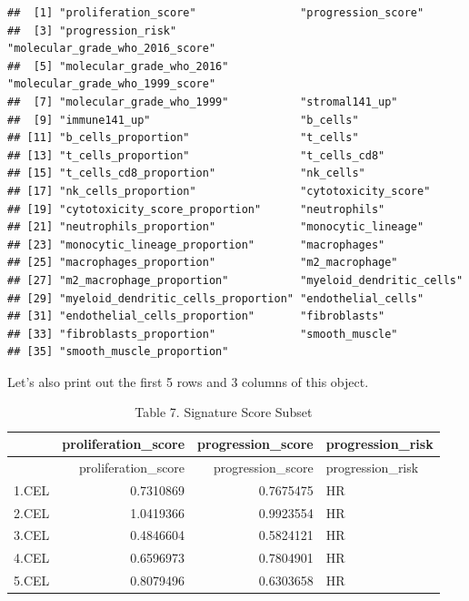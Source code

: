 \documentclass[
]{article}
\newenvironment{Shaded}{\begin{snugshade}}{\end{snugshade}}
\newcommand{\AttributeTok}[1]{\textcolor[rgb]{0.13,0.29,0.53}{#1}}
\newcommand{\DecValTok}[1]{\textcolor[rgb]{0.00,0.00,0.81}{#1}}
\newcommand{\FunctionTok}[1]{\textcolor[rgb]{0.13,0.29,0.53}{\textbf{#1}}}
\newcommand{\NormalTok}[1]{#1}
\newcommand{\SpecialCharTok}[1]{\textcolor[rgb]{0.81,0.36,0.00}{\textbf{#1}}}
\newcommand{\StringTok}[1]{\textcolor[rgb]{0.31,0.60,0.02}{#1}}
\begin{document}
\begin{verbatim}
##  [1] "proliferation_score"                "progression_score"                 
##  [3] "progression_risk"                   "molecular_grade_who_2016_score"    
##  [5] "molecular_grade_who_2016"           "molecular_grade_who_1999_score"    
##  [7] "molecular_grade_who_1999"           "stromal141_up"                     
##  [9] "immune141_up"                       "b_cells"                           
## [11] "b_cells_proportion"                 "t_cells"                           
## [13] "t_cells_proportion"                 "t_cells_cd8"                       
## [15] "t_cells_cd8_proportion"             "nk_cells"                          
## [17] "nk_cells_proportion"                "cytotoxicity_score"                
## [19] "cytotoxicity_score_proportion"      "neutrophils"                       
## [21] "neutrophils_proportion"             "monocytic_lineage"                 
## [23] "monocytic_lineage_proportion"       "macrophages"                       
## [25] "macrophages_proportion"             "m2_macrophage"                     
## [27] "m2_macrophage_proportion"           "myeloid_dendritic_cells"           
## [29] "myeloid_dendritic_cells_proportion" "endothelial_cells"                 
## [31] "endothelial_cells_proportion"       "fibroblasts"                       
## [33] "fibroblasts_proportion"             "smooth_muscle"                     
## [35] "smooth_muscle_proportion"
\end{verbatim}

Let's also print out the first 5 rows and 3 columns of this object.

\begin{Shaded}
\end{Shaded}

\begin{longtable}[]{@{}lrrl@{}}
\caption{Table 7. Signature Score Subset}\tabularnewline
\toprule\noalign{}
& proliferation\_score & progression\_score & progression\_risk \\
\midrule\noalign{}
\endfirsthead
\toprule\noalign{}
& proliferation\_score & progression\_score & progression\_risk \\
\midrule\noalign{}
\endhead
\bottomrule\noalign{}
\endlastfoot
1.CEL & 0.7310869 & 0.7675475 & HR \\
2.CEL & 1.0419366 & 0.9923554 & HR \\
3.CEL & 0.4846604 & 0.5824121 & HR \\
4.CEL & 0.6596973 & 0.7804901 & HR \\
5.CEL & 0.8079496 & 0.6303658 & HR \\
\end{longtable}
\end{document}

